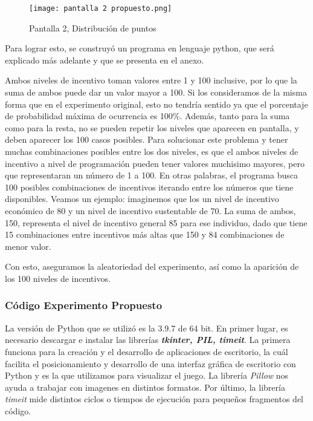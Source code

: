\documentclass[11pt,letterpaper]{article}
\begin{document}
\begin{figure}[h]
        \centering
        \texttt{[image: pantalla 2 propuesto.png]}
        \caption{Pantalla 2, Distribución de puntos}
    \end{figure}

Para lograr esto, se construyó un programa en lenguaje python, que será explicado más adelante y que se presenta en el anexo.

Ambos niveles de incentivo toman valores entre 1 y 100 inclusive, por lo que la suma de ambos puede dar un valor mayor a 100. Si los consideramos de la misma forma que en el experimento original, esto no tendría sentido ya que el porcentaje de probabilidad máxima de ocurrencia es 100\%. Además, tanto para la suma como para la resta, no se pueden repetir los niveles que aparecen en pantalla, y deben aparecer los 100 casos posibles. Para solucionar este problema y tener muchas combinaciones posibles entre los dos niveles, es que el ambos niveles de incentivo a nivel de programación pueden tener valores muchisimo mayores, pero que representaran un número de 1 a 100. En otras palabras, el programa busca 100 posibles combinaciones de incentivos iterando entre los números que tiene disponibles. Veamos un ejemplo: imaginemos que los un nivel de incentivo económico de 80 y un nivel de incentivo sustentable de 70. La suma de ambos, 150, representa el nivel de incentivo general 85 para ese individuo, dado que tiene 15 combinaciones entre incentivos más altas que 150 y 84 combinaciones de menor valor.

Con esto, aseguramos la aleatoriedad del experimento, así como la aparición de los 100 niveles de incentivos.

\subsubsection{Código Experimento Propuesto}

La versión de Python que se utilizó es la 3.9.7 de 64 bit. En primer lugar, es necesario descargar e instalar las librerías \textbf{\textit{tkinter, PIL, timeit}}. La primera funciona para la creación y el desarrollo de aplicaciones de escritorio, la cuál facilita el posicionamiento y desarrollo de una interfaz gráfica de escritorio con Python y es la que utilizamos para visualizar el juego. La librería \textit{Pillow} nos ayuda a trabajar con imagenes en distintos formatos. Por último, la librería \textit{timeit} mide distintos ciclos o tiempos de ejecución para pequeños fragmentos del código.
\end{document}
